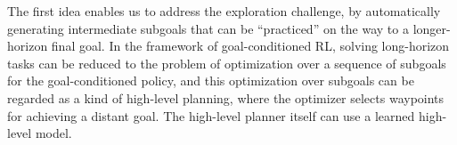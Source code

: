 The first idea enables us to address the exploration challenge, by automatically generating intermediate subgoals that can be ``practiced'' on the way to a longer-horizon final goal. In the framework of goal-conditioned RL, solving long-horizon tasks can be reduced to the problem of optimization over a sequence of subgoals for the goal-conditioned policy, and this optimization over subgoals can be regarded as a kind of high-level planning, where the optimizer selects waypoints for achieving a distant goal. The high-level planner itself can use a learned high-level model.


